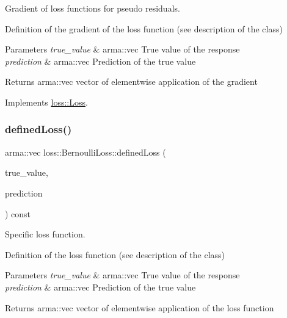Gradient of loss functions for pseudo residuals. 

Definition of the gradient of the loss function (see description of the class)


\begin{DoxyParams}{Parameters}
{\em true\+\_\+value} & {\ttfamily arma\+::vec} True value of the response \\
\hline
{\em prediction} & {\ttfamily arma\+::vec} Prediction of the true value\\
\hline
\end{DoxyParams}
\begin{DoxyReturn}{Returns}
{\ttfamily arma\+::vec} vector of elementwise application of the gradient 
\end{DoxyReturn}


Implements \mbox{\hyperlink{classloss_1_1_loss_a267a4de70747ade4b2d84ce35a448979}{loss\+::\+Loss}}.

\mbox{\label{classloss_1_1_bernoulli_loss_a1e347cacc5a5925874f579834f421236}} 
\subsubsection{\texorpdfstring{defined\+Loss()}{definedLoss()}}
{\footnotesize\ttfamily arma\+::vec loss\+::\+Bernoulli\+Loss\+::defined\+Loss (\begin{DoxyParamCaption}\item[{const arma\+::vec \&}]{true\+\_\+value,  }\item[{const arma\+::vec \&}]{prediction }\end{DoxyParamCaption}) const\hspace{0.3cm}{\ttfamily [virtual]}}



Specific loss function. 

Definition of the loss function (see description of the class)


\begin{DoxyParams}{Parameters}
{\em true\+\_\+value} & {\ttfamily arma\+::vec} True value of the response \\
\hline
{\em prediction} & {\ttfamily arma\+::vec} Prediction of the true value\\
\hline
\end{DoxyParams}
\begin{DoxyReturn}{Returns}
{\ttfamily arma\+::vec} vector of elementwise application of the loss function 
\end{DoxyReturn}


